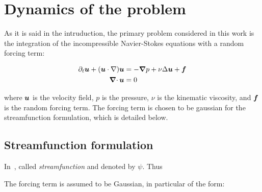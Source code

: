 \documentclass[../main.tex]{subfiles}
\begin{document}
\section{Dynamics of the problem}\label{sec:eqs}
As it is said in the intruduction, the primary problem considered in this work is the integration of the incompressible Navier-Stokes equations with a random forcing term:

\begin{align}
	\partial_t \boldsymbol{u} + (\boldsymbol{u} \cdot \nabla) \boldsymbol{u} & = -\grad p + \nu\Delta \boldsymbol{u} + \boldsymbol{f} \\
	\operatorname{\boldsymbol{\nabla}\cdot}{\boldsymbol{u}}                                    & = 0
\end{align}

where $\boldsymbol{u}$ is the velocity field, $p$ is the pressure, $\nu$ is the kinematic viscosity, and $\boldsymbol{f}$ is the random forcing term. The forcing term is chosen to be gaussian for the streamfunction formulation, which is detailed below.

\subsection{Streamfunction formulation}
In~\cite{Batchelor2000}, called \emph{streamfunction} and denoted by $\psi$. Thus

The forcing term is assumed to be Gaussian, in particular of the form:
\end{document}
